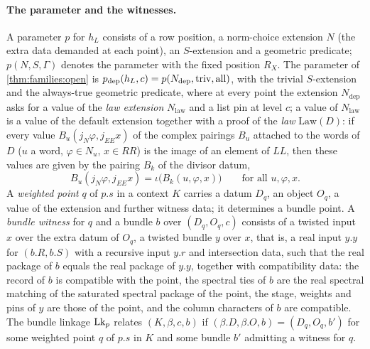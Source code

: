 \paragraph{The parameter and the witnesses.}
A parameter $p$ for $h_L$ consists of a row position, a norm-choice extension $N$ (the extra data demanded at each point),
an $S$-extension and a geometric predicate; $p(N,S,\Gamma)$ denotes the parameter with the fixed position $R_X$. The
parameter of \cref{thm:families:open} is $p_{\mathrm{dep}}(h_L,c)=p(N_{\mathrm{dep}},\mathrm{triv},\mathrm{all})$, with the
trivial $S$-extension and the always-true geometric predicate, where at every point the extension $N_{\mathrm{dep}}$ asks
for a value of the \emph{law extension} $N_{\mathrm{law}}$ and a list pin at level $c$; a value of $N_{\mathrm{law}}$ is a
value of the default extension together with a proof of the \emph{law} $\mathrm{Law}(D)$: if every value
$B_u(j_N\varphi,j_{EE}x)$ of the complex pairings $B_u$ attached to the words of $D$ ($u$ a word, $\varphi\in N_u$, $x\in\mathit{RR}$) is the image of an element of
$\mathit{LL}$, then these values are given by the pairing $B_k$ of the divisor datum,
\begin{equation}\label{pf:open0:eq:law}
B_u(j_N\varphi,j_{EE}x)=\iota\bigl(B_k(u,\varphi,x)\bigr)\qquad\text{for all }u,\varphi,x .
\end{equation}
A \emph{weighted point} $q$ of $p.s$ in a context $K$ carries a datum $D_q$, an object $O_q$, a value of the extension and
further witness data; it determines a bundle point. A \emph{bundle witness} for $q$ and a bundle $b$ over $(D_q,O_q,c)$
consists of a twisted input $x$ over the extra datum of $O_q$, a twisted bundle $y$ over $x$, that is, a real input
$y.y$ for $(b.R,b.S)$ with a recursive input $y.r$ and intersection data, such that the real package of $b$ equals the
real package of $y.y$, together with compatibility data: the record of $b$ is compatible with the point, the spectral
ties of $b$ are the real spectral matching of the saturated spectral package of the point, the stage, weights and pins
of $y$ are those of the point, and the column characters of $b$ are compatible. The bundle linkage $\mathrm{Lk}_p$
relates $(K,\beta,c,b)$ if $(\beta.D,\beta.O,b)=(D_q,O_q,b')$ for some weighted point $q$ of $p.s$ in $K$ and some bundle
$b'$ admitting a witness for $q$.

